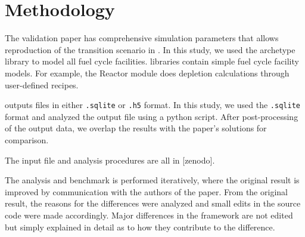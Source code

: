 \section{Methodology}

The validation paper \cite{feng_standardized_2016}
has comprehensive simulation parameters that allows
reproduction of the transition scenario in \Cyclus.
In this study, we used the \Cycamore \cite{huff_fundamental_2016}
 archetype library to model
all fuel cycle facilities. \Cycamore libraries contain
simple fuel cycle facility models. For example,
the Reactor module does depletion calculations through
user-defined recipes.

\Cyclus outputs files in either \texttt{.sqlite} or
\texttt{.h5} format. In this study, we used the
\texttt{.sqlite} format and analyzed the output file
using a python script. After post-processing of the
output data, we overlap the results with the
paper's solutions for comparison.

The input file and analysis procedures are all in
[zenodo].

The analysis and benchmark is performed iteratively,
where the original result is improved by communication
with the authors of the paper. From the original result,
the reasons for the differences were analyzed and
small edits in the source code were made accordingly.
Major differences in the framework are not edited but
simply explained in detail as to how they contribute
to the difference.
